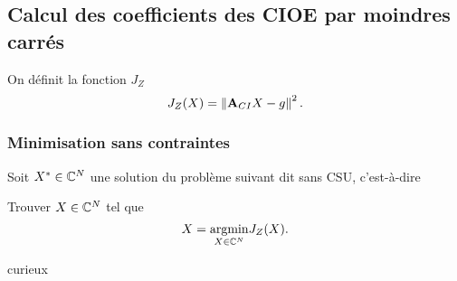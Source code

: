   \subsection{Calcul des coefficients des CIOE par moindres carrés}

      \begin{defn}
        On définit la fonction \(J_Z\)
        \begin{equation*}
          J_Z(X) = \left\lVert{\mathbf{A}}_{CI}X - {g}\right\rVert^2.
        \end{equation*}
      \end{defn}

    \subsubsection{Minimisation sans contraintes}

      \begin{defn}
        Soit \(X^* \in \mathbb C^N\) une solution du problème suivant dit sans CSU, c'est-à-dire

        Trouver \(X \in \mathbb C^N\) tel que
        \begin{equation*}
          X = {\underset{X\in \mathbb C^N}{\operatorname{argmin}}} J_Z(X).
        \end{equation*}
      \end{defn}

\begin{REM}
curieux
\end{REM}


